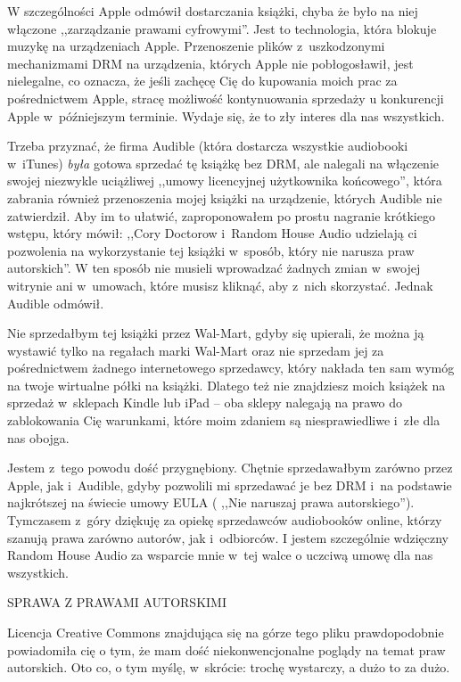 \documentclass[oneside,polish,11pt,rmheadings]{mwbk}
\begin{document}
W szczególności Apple odmówił dostarczania książki, chyba że było na niej włączone ,,zarządzanie prawami cyfrowymi''. Jest to technologia, która blokuje muzykę na urządzeniach Apple. Przenoszenie plików z~uszkodzonymi mechanizmami DRM na urządzenia, których Apple nie pobłogosławił, jest nielegalne, co oznacza, że jeśli zachęcę Cię do kupowania moich prac za pośrednictwem Apple, stracę możliwość kontynuowania sprzedaży u konkurencji Apple w~późniejszym terminie. Wydaje się, że to zły interes dla nas wszystkich. 


Trzeba przyznać, że firma Audible (która dostarcza wszystkie audiobooki w~iTunes) \textit{była }gotowa sprzedać tę książkę bez DRM, ale nalegali na włączenie swojej niezwykle uciążliwej ,,umowy licencyjnej użytkownika końcowego'', która zabrania również przenoszenia mojej książki na urządzenie, których Audible nie zatwierdził. Aby im to ułatwić, zaproponowałem po prostu nagranie krótkiego wstępu, który mówił: ,,Cory Doctorow i~Random House Audio udzielają ci pozwolenia na wykorzystanie tej książki w~sposób, który nie narusza praw autorskich''. W ten sposób nie musieli wprowadzać żadnych zmian w~swojej witrynie ani w~umowach, które musisz kliknąć, aby z~nich skorzystać. Jednak Audible odmówił. 


Nie sprzedałbym tej książki przez Wal-Mart, gdyby się upierali, że można ją wystawić tylko na regałach marki Wal-Mart oraz nie sprzedam jej za pośrednictwem żadnego internetowego sprzedawcy, który nakłada ten sam wymóg na twoje wirtualne półki na książki. Dlatego też nie znajdziesz moich książek na sprzedaż w~sklepach Kindle lub iPad -- oba sklepy nalegają na prawo do zablokowania Cię warunkami, które moim zdaniem są niesprawiedliwe i~złe dla nas obojga. 


Jestem z~tego powodu dość przygnębiony. Chętnie sprzedawałbym zarówno przez Apple, jak i~Audible, gdyby pozwolili mi sprzedawać je bez DRM i~na podstawie najkrótszej na świecie umowy EULA ( ,,Nie naruszaj prawa autorskiego''). Tymczasem z~góry dziękuję za opiekę sprzedawców audiobooków online, którzy szanują prawa zarówno autorów, jak i~odbiorców. I jestem szczególnie wdzięczny Random House Audio za wsparcie mnie w~tej walce o uczciwą umowę dla nas wszystkich. 

\bigskip
\noindent SPRAWA Z PRAWAMI AUTORSKIMI 


Licencja Creative Commons znajdująca się na górze tego pliku prawdopodobnie powiadomiła cię o tym, że mam dość niekonwencjonalne poglądy na temat praw autorskich. Oto co, o tym myślę, w~skrócie: trochę wystarczy, a dużo to za dużo. 
\end{document}

